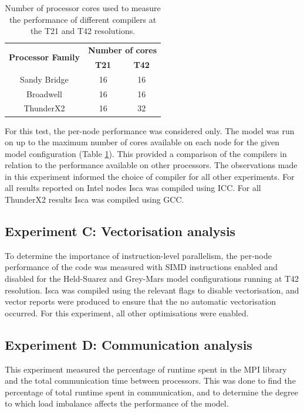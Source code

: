 \documentclass[a4paper,11pt]{report}
\begin{document}
\begin{table}[htp]
\caption[Number of processor cores used to measure the performance of different compilers]{Number of processor cores used to measure the performance of different compilers at the T21 and T42 resolutions.}
\begin{center}
\begin{tabular}{c c c}
\toprule
\multirow{2}{*}{\textbf{Processor Family}}	&	\multicolumn{2}{c}{\textbf{Number of cores}}	\\
							 		\cmidrule(lr){2-3}
								& 	\textbf{T21} 	&	\textbf{T42}			\\
\midrule
Sandy Bridge						&	16			&	16					\\
Broadwell							&	16			&	16					\\
ThunderX2						&	16			&	32					\\
\bottomrule
\end{tabular}
\end{center}
\label{tbl:-compiler-cores}
\end{table}%

\par

For this test, the per-node performance was considered only. The model was run on up to the maximum number of cores available on each node for the given model configuration (Table \ref{tbl:-compiler-cores}). This provided a comparison of the compilers in relation to the performance available on other processors. The observations made in this experiment informed the choice of compiler for all other experiments. For all results reported on Intel nodes Isca was compiled using ICC. For all ThunderX2 results Isca was compiled using GCC.

\subsection{Experiment C: Vectorisation analysis}
To determine the importance of instruction-level parallelism, the per-node performance of the code was measured with SIMD instructions enabled and disabled for the Held-Suarez and Grey-Mars model configurations running at T42 resolution. Isca was compiled using the relevant flags to disable vectorisation, and vector reports were produced to ensure that the no automatic vectorisation occurred. For this experiment, all other optimisations were enabled.

\subsection{Experiment D: Communication analysis}
This experiment measured the percentage of runtime spent in the MPI library and the total communication time between processors. This was done to find the percentage of total runtime spent in communication, and to determine the degree to which load imbalance affects the performance of the model.
	
\end{document}
